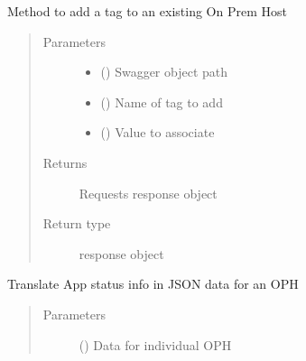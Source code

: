 \documentclass[letterpaper,10pt,english]{sphinxmanual}
\begin{document}
\begin{fulllineitems}
\begin{fulllineitems}
\label{\detokenize{b1oph-class:bloxone.b1oph.oph_add_tag}}
\sphinxAtStartPar
Method to add a tag to an existing On Prem Host
\begin{quote}\begin{description}
\item[{Parameters}] \leavevmode\begin{itemize}
\item {} 
\sphinxAtStartPar
{} () \textendash{} Swagger object path

\item {} 
\sphinxAtStartPar
{} () \textendash{} Name of tag to add

\item {} 
\sphinxAtStartPar
{} () \textendash{} Value to associate

\end{itemize}

\item[{Returns}] \leavevmode
\sphinxAtStartPar
Requests response object

\item[{Return type}] \leavevmode
\sphinxAtStartPar
response object

\end{description}\end{quote}

\end{fulllineitems}


\begin{fulllineitems}
\label{\detokenize{b1oph-class:bloxone.b1oph.oph_app_status}}
\sphinxAtStartPar
Translate App status info in JSON data for an OPH
\begin{quote}\begin{description}
\item[{Parameters}] \leavevmode
\sphinxAtStartPar
{} () \textendash{} Data for individual OPH


\end{description}
\end{quote}
\end{fulllineitems}
\end{fulllineitems}
\end{document}
